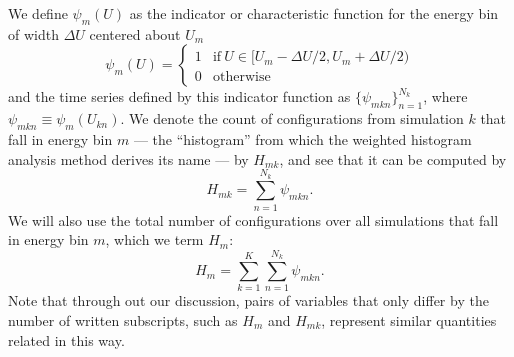 We define $\psi_m(U)$ as the indicator or characteristic function for the energy bin of width $\Delta U$ centered about $U_m$
\begin{equation}
\psi_m(U) =
\begin{cases}
1 & \mathrm{if} \: U \in [U_m - \Delta U / 2, U_m + \Delta U / 2) \\
0 & \mathrm{otherwise}
\end{cases} \label{wham:equation:energy-indicator-function}
\end{equation}
and the time series defined by this indicator function as $\{ \psi_{mkn} \}_{n=1}^{N_k}$, where $\psi_{mkn} \equiv \psi_m(U_{kn})$.  We denote the count of configurations from simulation $k$ that
fall in energy bin $m$ --- the ``histogram'' from which the weighted histogram analysis method derives its name --- by $H_{mk}$, and see that it can be computed by
\begin{equation}
H_{mk} = \sum_{n=1}^{N_k} \psi_{mkn} .
\end{equation}
We will also use the total number of configurations over all simulations that fall in energy bin $m$, which we term $H_m$:
\begin{equation}
H_m = \sum_{k=1}^{K} \sum_{n=1}^{N_k} \psi_{mkn} .
\end{equation}
Note that through out our discussion, pairs of variables that only differ by the number of written subscripts, such as $H_m$ and $H_{mk}$, represent similar quantities related in this way.

